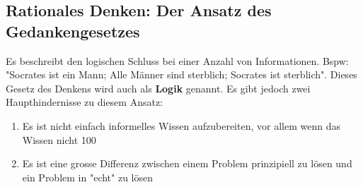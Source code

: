 \documentclass{article}
\theoremstyle{merke}
\theoremstyle{definition}
\begin{document}
\subsection{Rationales Denken: Der Ansatz des Gedankengesetzes}
Es beschreibt den logischen Schluss bei einer Anzahl von Informationen. Bspw: "Socrates ist ein Mann; Alle Männer sind sterblich; Socrates ist sterblich". Dieses Gesetz des Denkens wird auch als \textbf{Logik}
 genannt. Es gibt jedoch zwei Haupthindernisse zu diesem Ansatz:
 \begin{enumerate}
 	\item Es ist nicht einfach informelles Wissen aufzubereiten, vor allem wenn das Wissen nicht 100%
 	\item Es ist eine grosse Differenz zwischen einem Problem prinzipiell zu lösen und ein Problem in "echt" zu lösen 
 \end{enumerate}
 
\end{document}
